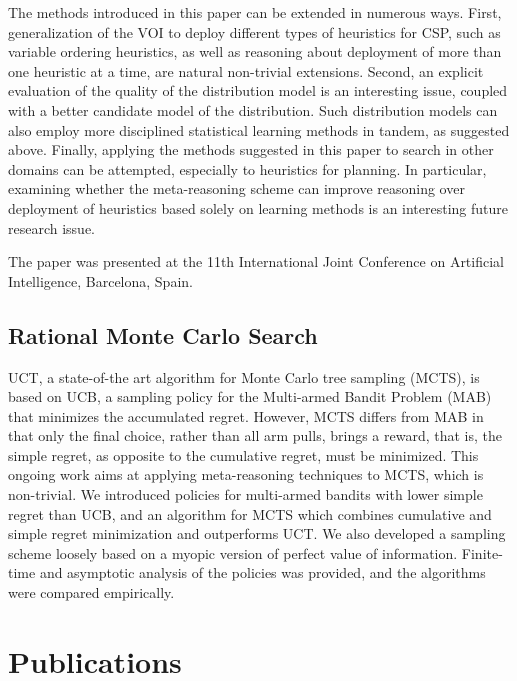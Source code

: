 \documentclass[]{article}
\begin{document}
The methods introduced in this paper can be extended in numerous
ways. First, generalization of the VOI to deploy different types of
heuristics for CSP, such as variable ordering heuristics, as well as
reasoning about deployment of more than one heuristic at a time, are
natural non-trivial extensions. Second, an explicit evaluation of the
quality of the distribution model is an interesting issue, coupled
with a better candidate model of the distribution.  Such distribution
models can also employ more disciplined statistical learning methods
in tandem, as suggested above. Finally, applying the methods suggested
in this paper to search in other domains can be attempted, especially
to heuristics for planning.  In particular, examining whether
the meta-reasoning scheme can improve reasoning over deployment of
heuristics based solely on learning methods is an interesting future
research issue.

The paper was presented at the 11th International Joint Conference on
Artificial Intelligence, Barcelona, Spain.

\subsection{Rational Monte Carlo Search}
\label{sec:doingbetter}

UCT, a state-of-the art algorithm for Monte Carlo tree sampling
(MCTS), is based on UCB, a sampling policy for the Multi-armed Bandit
Problem (MAB) that minimizes the accumulated regret. However, MCTS
differs from MAB in that only the final choice, rather than all arm
pulls, brings a reward, that is, the simple regret, as opposite to the
cumulative regret, must be minimized. This ongoing work
\cite{TolpinShimony.doingbetter} aims at applying meta-reasoning
techniques to MCTS, which is non-trivial.  We introduced policies for
multi-armed bandits with lower simple regret than UCB, and an
algorithm for MCTS which combines cumulative and simple regret
minimization and outperforms UCT. We also developed a sampling scheme
loosely based on a myopic version of perfect value of
information. Finite-time and asymptotic analysis of the policies was
provided, and the algorithms were compared empirically.
\cite{TolpinShimony.doingbetter}

\section{Publications}



\end{document}
